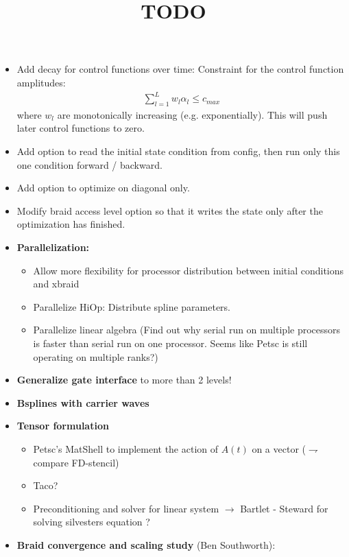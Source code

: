 \documentclass{article}
\title{TODO}
\begin{document}
\maketitle

\begin{itemize}
  \item Add decay for control functions over time: Constraint for the control function amplitudes:
      \begin{align*}
          \sum_{l=1}^L w_l\alpha_l \leq c_{max}
      \end{align*}
        where $w_l$ are monotonically increasing (e.g. exponentially). This will push later control functions to zero. 
  \item Add option to read the initial state condition from config, then run only this one condition forward / backward.
  \item Add option to optimize on diagonal only.
  \item Modify braid access level option so that it writes the state only after the optimization has finished. 
  \item \textbf{Parallelization:}
      \begin{itemize}
        \item Allow more flexibility for processor distribution between initial conditions and xbraid
        \item Parallelize HiOp: Distribute spline parameters.
        \item Parallelize linear algebra (Find out why serial run on multiple processors is faster than serial run on one processor. Seems like Petsc is still operating on multiple ranks?)
      \end{itemize}
  \item \textbf{Generalize gate interface} to more than 2 levels!
  \item \textbf{Bsplines with carrier waves}
  \item \textbf{Tensor formulation}
        \begin{itemize}
          \item Petsc's MatShell to implement the action of $A(t)$ on a vector ($\rightharpoondown$ compare FD-stencil)
          \item Taco?
          \item Preconditioning and solver for linear system $\rightarrow$ Bartlet - Steward for solving silvesters equation ?
        \end{itemize}
  \item \textbf{Braid convergence and scaling study} (Ben Southworth):

\end{itemize}
\end{document}
